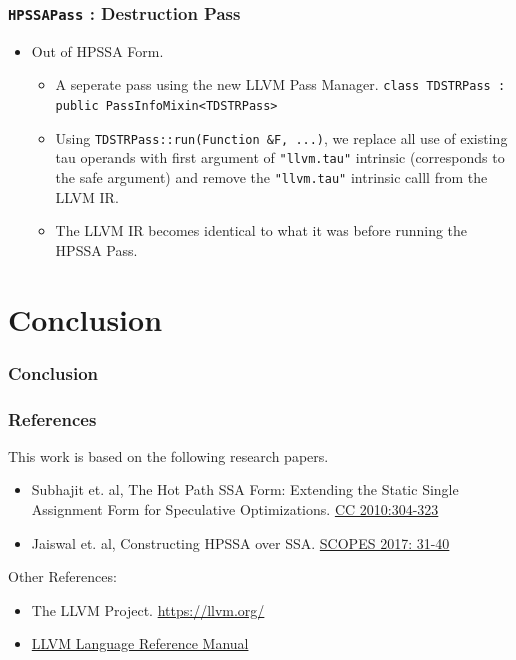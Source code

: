 \documentclass[aspectratio=169, compress]{beamer}
\begin{document}
\begin{frame}
	\frametitle{\texttt{HPSSAPass} : Destruction Pass}
	\begin{itemize}
		\item Out of HPSSA Form. 
		\begin{itemize}
			\item A seperate pass using the new LLVM Pass Manager. \texttt{class TDSTRPass : public PassInfoMixin<TDSTRPass>}
			\item Using \texttt{TDSTRPass::run(Function &F, ...)}, we replace all use of existing tau operands with first argument of  \texttt{"llvm.tau"} intrinsic (corresponds to the safe argument) and remove the \texttt{"llvm.tau"} intrinsic calll from the LLVM IR.
			\item The LLVM IR becomes identical to what it was before running the HPSSA Pass. 
		\end{itemize}
	\end{itemize}
\end{frame}

\footnotesize

\section{Conclusion}
\begin{frame}
	\frametitle{Conclusion}
\end{frame}
\begin{frame}
	\frametitle{References}
	This work is based on the following research papers.
	\begin{itemize}
		\item Subhajit et. al, The Hot Path SSA Form: Extending the Static Single Assignment Form for Speculative Optimizations. \href{https://link.springer.com/chapter/10.1007/978-3-642-11970-5_17}{CC 2010:304-323}
		\item Jaiswal et. al, Constructing HPSSA over SSA.
		\href{https://dl.acm.org/doi/10.1145/3078659.3078660}{SCOPES 2017: 31-40}
	\end{itemize}
	Other References:
\begin{itemize}
	\item The LLVM Project. \href{https://llvm.org/}{https://llvm.org/}
	\item \href{https://llvm.org/docs/LangRef.html}{LLVM Language Reference Manual}
\end{itemize}
\end{frame}
\footnotesize
\end{document}
